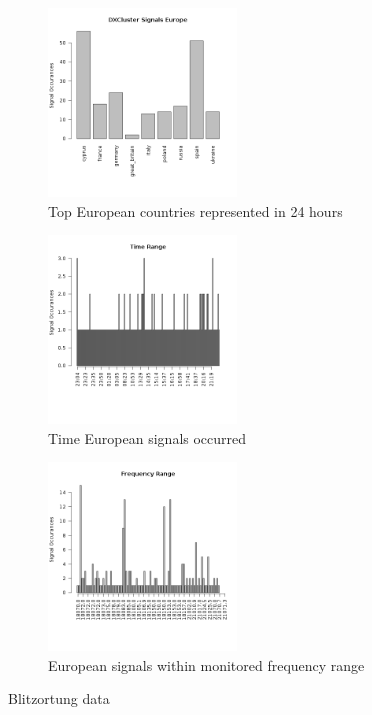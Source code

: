 \documentclass[runningheads,a4paper]{llncs}
\begin{document}
%
\begin{figure}	
	\centering
	\begin{subfigure}[t]{8cm}
		\centering
		\includegraphics[width=5cm]{images/68}
		\caption{Top European countries represented in 24 hours}\label{fig:dxcluster_country_barplot}		
	\end{subfigure}
	\quad
	\begin{subfigure}[t]{5cm}
		\centering
		\includegraphics[width=5cm]{images/69}
		\caption{Time European signals occurred}\label{fig:dxcluster_time_plot}		
	\end{subfigure}
	\quad
	\begin{subfigure}[t]{5cm}
		\centering
		\includegraphics[width=5cm]{images/70}
		\caption{European signals within monitored frequency range}\label{fig:dxcluster_frequency_plot}
	\end{subfigure}
	\caption{Blitzortung data}\label{dxcluster_data}
\end{figure}
%
\end{document}
